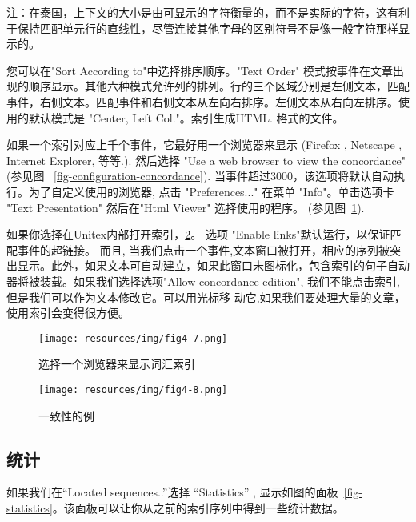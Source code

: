 \bigskip
\noindent 注：在泰国，上下文的大小是由可显示的字符衡量的，而不是实际的字符，这有利于保持匹配单元行的直线性，尽管连接其他字母的区别符号不是像一般字符那样显示的。 


\bigskip
\noindent 您可以在"Sort According to"中选择排序顺序。"Text Order" 模式按事件在文章出现的顺序显示。其他六种模式允许列的排列。行的三个区域分别是左侧文本，匹配事件，右侧文本。匹配事件和右侧文本从左向右排序。左侧文本从右向左排序。使用的默认模式是 "Center, Left Col."。索引生成HTML.
格式的文件。

\bigskip
\noindent 如果一个索引对应上千个事件，它最好用一个浏览器来显示  (Firefox \cite{Firefox}, Netscape \cite{Netscape}, 
Internet Explorer, 等等.).
\newline
然后选择 "Use a web browser to view the concordance" (参见图
	~\ref{fig-configuration-concordance}).
	当事件超过3000，该选项将默认自动执行。为了自定义使用的浏览器, 点击 "Preferences..." 在菜单 "Info"。单击选项卡 "Text Presentation" 然后在"Html Viewer" 选择使用的程序。
 (参见图~\ref{fig-browser-selection}).

\bigskip
\noindent {} 如果你选择在Unitex内部打开索引，\ref{fig-example-concordance}。 
选项 "Enable links"默认运行，以保证匹配事件的超链接。 而且, 当我们点击一个事件,文本窗口被打开，相应的序列被突出显示。此外，如果文本可自动建立，如果此窗口未图标化，包含索引的句子自动器将被装载。如果我们选择选项"Allow concordance edition", 我们不能点击索引, 但是我们可以作为文本修改它。可以用光标移
动它,如果我们要处理大量的文章，使用索引会变得很方便。


\begin{figure}[h]
\begin{center}
\texttt{[image: resources/img/fig4-7.png]}
\caption{选择一个浏览器来显示词汇索引\label{fig-browser-selection}}
\end{center}
\end{figure}

\begin{figure}[!p]
\begin{center}
\texttt{[image: resources/img/fig4-8.png]}
\caption{一致性的例\label{fig-example-concordance}}
\end{center}
\end{figure}

\clearpage
\subsection{统计}
\label{section-statistics}
如果我们在``Located sequences..''选择 ``Statistics'' ,
显示如图的面板~\ref{fig-statistics}。该面板可以让你从之前的索引序列中得到一些统计数据。 

